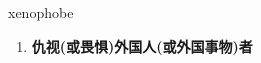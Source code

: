 
\begin{frame}
{\huge xenophobe}
\begin{center}
\begin{enumerate}\Large
  \item \textbf{仇视(或畏惧)外国人(或外国事物)者}
\end{enumerate}
\end{center}
\end{frame}
